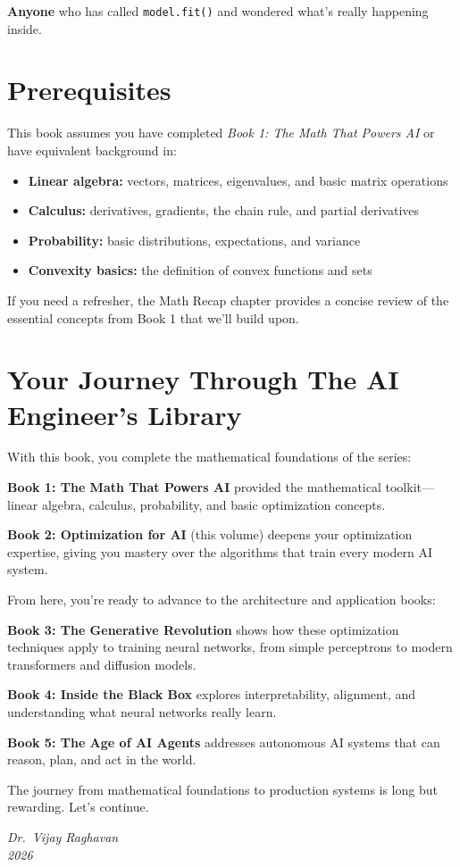 \documentclass[../main.tex]{subfiles}
\begin{document}
\textbf{Anyone} who has called \texttt{model.fit()} and wondered what's really happening inside.

\section*{Prerequisites}

This book assumes you have completed \textit{Book 1: The Math That Powers AI} or have equivalent background in:
\begin{itemize}
    \item \textbf{Linear algebra:} vectors, matrices, eigenvalues, and basic matrix operations
    \item \textbf{Calculus:} derivatives, gradients, the chain rule, and partial derivatives
    \item \textbf{Probability:} basic distributions, expectations, and variance
    \item \textbf{Convexity basics:} the definition of convex functions and sets
\end{itemize}

If you need a refresher, the Math Recap chapter provides a concise review of the essential concepts from Book 1 that we'll build upon.

\section*{Your Journey Through The AI Engineer's Library}

With this book, you complete the mathematical foundations of the series:

\textbf{Book 1: The Math That Powers AI} provided the mathematical toolkit---linear algebra, calculus, probability, and basic optimization concepts.

\textbf{Book 2: Optimization for AI} (this volume) deepens your optimization expertise, giving you mastery over the algorithms that train every modern AI system.

From here, you're ready to advance to the architecture and application books:

\textbf{Book 3: The Generative Revolution} shows how these optimization techniques apply to training neural networks, from simple perceptrons to modern transformers and diffusion models.

\textbf{Book 4: Inside the Black Box} explores interpretability, alignment, and understanding what neural networks really learn.

\textbf{Book 5: The Age of AI Agents} addresses autonomous AI systems that can reason, plan, and act in the world.

The journey from mathematical foundations to production systems is long but rewarding. Let's continue.

\vspace{1cm}
\noindent\textit{Dr.\ Vijay Raghavan}\\
\textit{2026}
\end{document}
